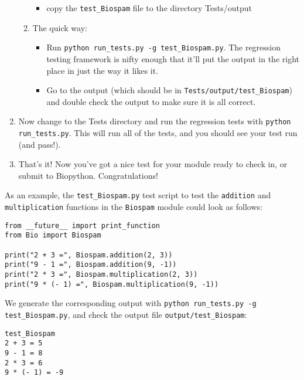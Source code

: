 \documentclass{report}
\begin{document}
\begin{enumerate}
\begin{enumerate}
\begin{itemize}
     \item copy the \verb|test_Biospam| file to the directory Tests/output
    
   \end{itemize}

   \item The quick way:

   \begin{itemize}
      \item Run \verb|python run_tests.py -g test_Biospam.py|. The
            regression testing framework is nifty enough that it'll put
            the output in the right place in just the way it likes it.  
      
       \item Go to the output (which should be in \verb|Tests/output/test_Biospam|) and double check the output to make sure it is all correct.

   \end{itemize}

 \end{enumerate}
      
 \item Now change to the Tests directory and run the regression tests
       with \verb|python run_tests.py|. This will run all of the tests, and
       you should see your test run (and pass!).
      
  \item That's it! Now you've got a nice test for your module ready to check in,
  or submit to Biopython.  Congratulations!
\end{enumerate}

As an example, the \verb|test_Biospam.py| test script to test the
\verb|addition| and \verb|multiplication| functions in the \verb|Biospam|
module  could look as follows:

\begin{verbatim}
from __future__ import print_function
from Bio import Biospam

print("2 + 3 =", Biospam.addition(2, 3))
print("9 - 1 =", Biospam.addition(9, -1))
print("2 * 3 =", Biospam.multiplication(2, 3))
print("9 * (- 1) =", Biospam.multiplication(9, -1))
\end{verbatim}

We generate the corresponding output with \verb|python run_tests.py -g test_Biospam.py|, and check the output file \verb|output/test_Biospam|:

\begin{verbatim}
test_Biospam
2 + 3 = 5
9 - 1 = 8
2 * 3 = 6
9 * (- 1) = -9
\end{verbatim}
\end{document}
